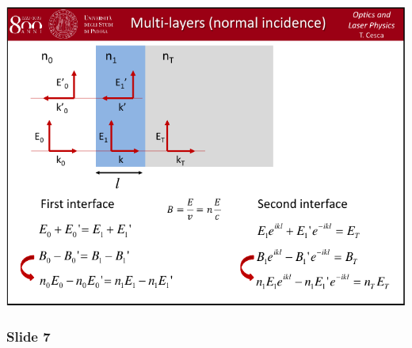 \documentclass[../main/main.tex]{subfiles}
\begin{document}
\begin{minipage}[]{0.5\linewidth}
\centering
\includegraphics[page=6,width=1\textwidth]{../lessons/pdf_file/06_lecture.pdf}
\end{minipage}
\hspace{0.3cm}\vspace{0.3cm}
\begin{minipage}[c]{0.47\linewidth}



\end{minipage}

\newpage

\subsubsection*{Slide 7}
\end{document}
